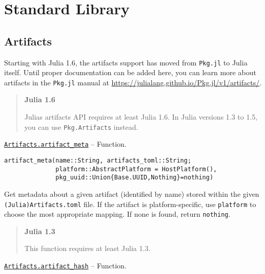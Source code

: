 
\part{Standard Library}


\hypertarget{8019656286069694125}{}


\chapter{Artifacts}





Starting with Julia 1.6, the artifacts support has moved from \texttt{Pkg.jl} to Julia itself. Until proper documentation can be added here, you can learn more about artifacts in the \texttt{Pkg.jl} manual at \href{https://julialang.github.io/Pkg.jl/v1/artifacts/}{https://julialang.github.io/Pkg.jl/v1/artifacts/}.



\begin{quote}
\textbf{Julia 1.6}

Julia{\textquotesingle}s artifacts API requires at least Julia 1.6. In Julia versions 1.3 to 1.5, you can use \texttt{Pkg.Artifacts} instead.

\end{quote}

\hypertarget{14383421832824386986}{}
\hyperlink{14383421832824386986}{\texttt{Artifacts.artifact\_meta}}  -- {Function.}

\begin{adjustwidth}{2em}{0pt}


\begin{verbatim}
artifact_meta(name::String, artifacts_toml::String;
              platform::AbstractPlatform = HostPlatform(),
              pkg_uuid::Union{Base.UUID,Nothing}=nothing)
\end{verbatim}

Get metadata about a given artifact (identified by name) stored within the given \texttt{(Julia)Artifacts.toml} file.  If the artifact is platform-specific, use \texttt{platform} to choose the most appropriate mapping.  If none is found, return \texttt{nothing}.

\begin{quote}
\textbf{Julia 1.3}

This function requires at least Julia 1.3.

\end{quote}


\end{adjustwidth}
\hypertarget{18302358048898958192}{}
\hyperlink{18302358048898958192}{\texttt{Artifacts.artifact\_hash}}  -- {Function.}

